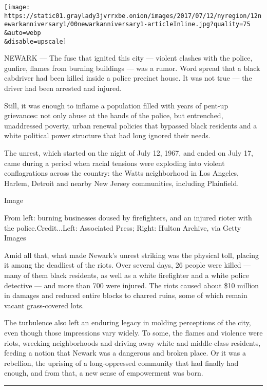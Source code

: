 \texttt{[image: https://static01.graylady3jvrrxbe.onion/images/2017/07/12/nyregion/12newarkanniversary1/00newarkanniversary1-articleInline.jpg?quality=75\\\&auto=webp\\\&disable=upscale]}

NEWARK --- The fuse that ignited this city --- violent clashes with the
police, gunfire, flames from burning buildings --- was a rumor. Word
spread that a black cabdriver had been killed inside a police precinct
house. It was not true --- the driver had been arrested and injured.

Still, it was enough to inflame a population filled with years of
pent-up grievances: not only abuse at the hands of the police, but
entrenched, unaddressed poverty, urban renewal policies that bypassed
black residents and a white political power structure that had long
ignored their needs.

The unrest, which started on the night of July 12, 1967, and ended on
July 17, came during a period when racial tensions were exploding into
violent conflagrations across the country: the Watts neighborhood in Los
Angeles, Harlem, Detroit and nearby New Jersey communities, including
Plainfield.

Image

From left: burning businesses doused by firefighters, and an injured
rioter with the police.Credit...Left: Associated Press; Right: Hulton
Archive, via Getty Images

Amid all that, what made Newark's unrest striking was the physical toll,
placing it among the deadliest of the riots. Over several days, 26
people were killed --- many of them black residents, as well as a white
firefighter and a white police detective --- and more than 700 were
injured. The riots caused about \$10 million in damages and reduced
entire blocks to charred ruins, some of which remain vacant
grass-covered lots.

The turbulence also left an enduring legacy in molding perceptions of
the city, even though those impressions vary widely. To some, the flames
and violence were riots, wrecking neighborhoods and driving away white
and middle-class residents, feeding a notion that Newark was a dangerous
and broken place. Or it was a rebellion, the uprising of a
long-oppressed community that had finally had enough, and from that, a
new sense of empowerment was born.

\begin{center}\rule{0.5\linewidth}{\linethickness}\end{center}

